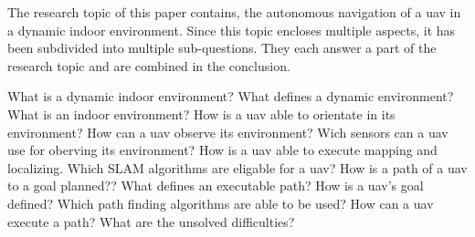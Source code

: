 The research topic of this paper contains, the autonomous navigation of a \acs{uav} in a dynamic indoor environment. Since this topic encloses multiple aspects, it has been subdivided into multiple sub\hyp{}questions. They each answer a part of the research topic and are combined in the conclusion.


\begin{outline}
  \1 What is a dynamic indoor environment?
    \2 What defines a dynamic environment?
    \2 What is an indoor environment?
  \1 How is a \acs{uav} able to orientate in its environment?
    \2 How can a \acs{uav} observe its environment?
      \3 Wich sensors can a \acs{uav} use for oberving its environment?
    \2 How is a \acs{uav} able to execute mapping and localizing.
      \3 Which SLAM algorithms are eligable for a \acs{uav}?
  \1 How is a path of a \acs{uav} to a goal planned??
    \2 What defines an executable path?
    \2 How is a \acs{uav}'s goal defined?
    \2 Which path finding algorithms are able to be used?
  \1 How can a \acs{uav} execute a path?
  \1 What are the unsolved difficulties?
\end{outline}